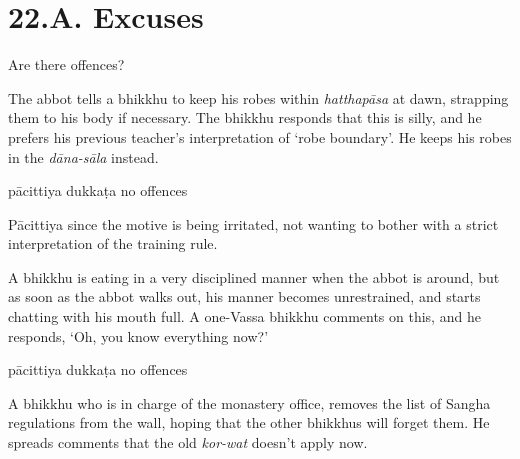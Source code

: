 \chapter{22.A. Excuses}
\renewcommand*{\theChapterTitle}{22.A. Excuses}

\begin{exam}{\autoExamName}

  \begin{problem*}

    Are there offences?

    \begin{parts}

      \item The abbot tells a bhikkhu to keep his robes within \emph{hatthapāsa}
      at dawn, strapping them to his body if necessary. The bhikkhu responds
      that this is silly, and he prefers his previous teacher's interpretation
      of `robe boundary'. He keeps his robes in the \emph{dāna-sāla} instead.

      \bigskip

      \begin{answers}{3}
        \bChoices
         pācittiya\eAns
         dukkaṭa\eAns
         no offences\eAns
        \eChoices
      \end{answers}

      \begin{solution}
        Pācittiya since the motive is being irritated, not wanting to bother
        with a strict interpretation of the training rule.
      \end{solution}

      \bigskip

      \item A bhikkhu is eating in a very disciplined manner when the abbot is
      around, but as soon as the abbot walks out, his manner becomes
      unrestrained, and starts chatting with his mouth full. A one-Vassa bhikkhu
      comments on this, and he responds, `Oh, you know everything now?'

      \bigskip

      \begin{answers}{3}
        \bChoices
         pācittiya\eAns
         dukkaṭa\eAns
         no offences\eAns
        \eChoices
      \end{answers}

      \bigskip

      \item A bhikkhu who is in charge of the monastery office, removes the list
      of Sangha regulations from the wall, hoping that the other bhikkhus will
      forget them. He spreads comments that the old \emph{kor-wat} doesn't apply now.


\end{parts}
\end{problem*}
\end{exam}
